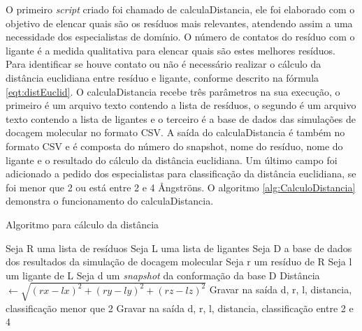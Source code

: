 O primeiro \emph{script} criado foi chamado de calculaDistancia, ele foi elaborado com o objetivo de elencar quais são os resíduos mais relevantes, atendendo assim a uma necessidade dos especialistas de domínio. O número de contatos do resíduo com o ligante é a medida qualitativa para elencar quais são estes melhores resíduos. Para identificar se houve contato ou não é necessário realizar o cálculo da distância euclidiana entre resíduo e ligante, conforme descrito na fórmula \ref{eqt:distEuclid}. O calculaDistancia recebe três parâmetros na sua execução, o primeiro é um arquivo texto contendo a lista de resíduos, o segundo é um arquivo texto contendo a lista de ligantes e o terceiro é a base de dados das simulações de docagem molecular no formato CSV. A saída do calculaDistancia é também no formato CSV e é composta do número do snapshot, nome do resíduo, nome do ligante e o resultado do cálculo da distância euclidiana. Um último campo foi adicionado a pedido dos especialistas para classificação da distância euclidiana, se foi menor que 2 ou está entre 2 e 4 {\AA}ngstr\"ons. O algoritmo \ref{alg:CalculoDistancia} demonstra o funcionamento do calculaDistancia.

\renewcommand{\algorithmicfor}{\textbf{para}}
\renewcommand{\algorithmicif}{\textbf{se}}
\renewcommand{\algorithmicthen}{\textbf{então}}
\renewcommand{\algorithmicelse}{\textbf{senão}}
\renewcommand{\algorithmicendif}{\textbf{fim se}}
\renewcommand{\algorithmicendfor}{\textbf{fim para}}
\renewcommand{\algorithmicdo}{\textbf{faça}}

\begin{algorithm}[H]
\caption{Algoritmo para cálculo da distância}
\label{alg:CalculoDistancia}
{\fontsize{10}{10}\selectfont
\begin{algorithmic}[1]
	\STATE Seja R uma lista de resíduos
	\STATE Seja L uma lista de ligantes
	\STATE Seja D a base de dados dos resultados da simulação de docagem molecular
	\STATE Seja r um resíduo de R
	\STATE Seja l um ligante de L
	\STATE Seja d um \emph{snapshot} da conformação da base D
			\STATE Distância $\gets \sqrt{(rx - lx)^{2} +(ry - ly)^{2} + (rz - lz)^{2}}$ 
			\ENDIF
				\STATE Gravar na saída d, r, l, distancia, classificação menor que 2
				\ELSE
				\STATE Gravar na saída d, r, l, distancia, classificação entre 2 e 4
				\ENDIF
			\ENDIF
			\ENDFOR
		\ENDFOR
	\ENDFOR
\end{algorithmic}
}
\end{algorithm}

